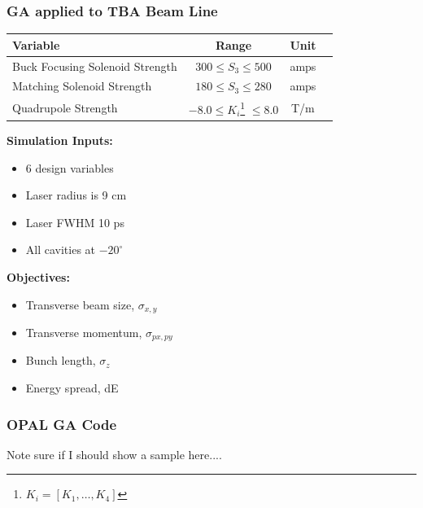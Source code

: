 \documentclass[professionalfonts,t]{beamer}
\begin{document}
\begin{frame}
	\frametitle{GA applied to TBA Beam Line}
	\begin{center}
		\setcounter{mpfootnote}{\value{footnote}}%
		\renewcommand{\thempfootnote}{\arabic{mpfootnote}}%
		\begin{tabular}{ l *{3}{c}}
			\textbf{Variable} & \textbf{Range} & \textbf{Unit} \\
			\midrule
			Buck Focusing Solenoid Strength & $ 300 \le S_3 \le 500$  & amps \\
			Matching Solenoid Strength & $ 180 \le S_3 \le 280$  & amps \\
			Quadrupole Strength  & $-8.0 \le K_i$\footnote[1]{$K_i=[K_{1},\ldots,K_{4}]$}  $\le 8.0$ & T/m \\
		\end{tabular}
	\end{center}
\begin{minipage}{0.4\textwidth}
	\textbf{Simulation Inputs:}
	\begin{itemize}
		\item 6 design variables
		\item Laser radius is 9 cm
		\item Laser FWHM 10 ps
		\item All cavities at $-20^\circ$
	\end{itemize}
\end{minipage}
\begin{minipage}{0.55\textwidth}
	\textbf{Objectives:}
	\begin{itemize}
		\item Transverse beam size, $\sigma_{x,y}$
		\item Transverse momentum, $\sigma_{px,py}$
		\item Bunch length, $\sigma_z$
		\item Energy spread, dE
	\end{itemize}
\end{minipage}
\end{frame}

\begin{frame}
	\frametitle{OPAL GA Code}
	Note sure if I should show a sample here....
\end{frame}
\end{document}
